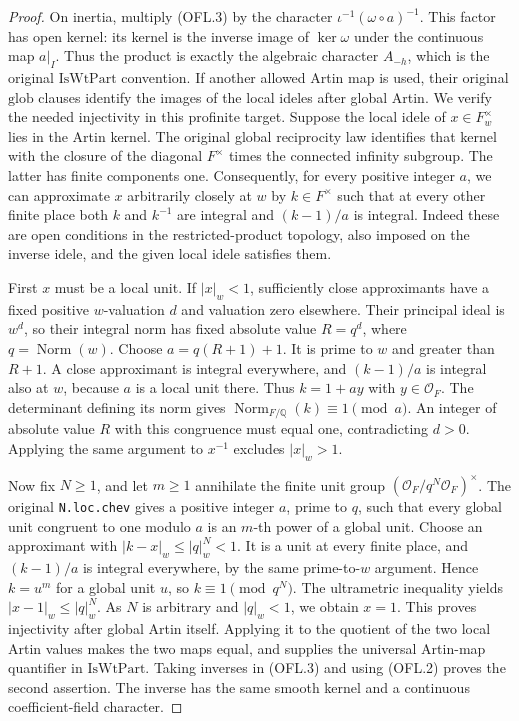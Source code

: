 \begin{proof}
On inertia, multiply (OFL.3) by the character
\(\iota^{-1}(\omega\circ a)^{-1}\).  This factor has open
kernel: its kernel is the inverse image of \(\ker\omega\)
under the continuous map \(a|_I\).  Thus the product is exactly
the algebraic character \(A_{-h}\), which is the original
\(\mathrm{IsWtPart}\) convention.  If another allowed Artin map
is used, their original \(\mathrm{glob}\) clauses identify the
images of the local ideles after global Artin.  We verify the
needed injectivity in this profinite target.  Suppose the local
idele of \(x\in F_w^\times\) lies in the Artin kernel.  The
original global reciprocity law identifies that kernel with the
closure of the diagonal \(F^\times\) times the connected
infinity subgroup.  The latter has finite components one.
Consequently, for every positive integer \(a\), we can approximate
\(x\) arbitrarily closely at \(w\) by \(k\in F^\times\)
such that at every other finite place both \(k\) and \(k^{-1}\)
are integral and \((k-1)/a\) is integral.  Indeed these are open
conditions in the restricted-product topology, also imposed on
the inverse idele, and the given local idele satisfies them.

First \(x\) must be a local unit.  If \(|x|_w<1\), sufficiently
close approximants have a fixed positive \(w\)-valuation \(d\)
and valuation zero elsewhere.  Their principal ideal is
\(w^d\), so their integral norm has fixed absolute value
\(R=q^d\), where \(q=\operatorname{Norm}(w)\).
Choose \(a=q(R+1)+1\).  It is prime to \(w\) and greater
than \(R+1\).  A close approximant is integral everywhere,
and \((k-1)/a\) is integral also at \(w\), because \(a\)
is a local unit there.  Thus \(k=1+ay\) with \(y\in\mathcal O_F\).
The determinant defining its norm gives
\(\operatorname{Norm}_{F/\mathbb Q}(k)\equiv1\pmod a\).
An integer of absolute value \(R\) with this congruence must
equal one, contradicting \(d>0\).  Applying the same argument
to \(x^{-1}\) excludes \(|x|_w>1\).

Now fix \(N\ge1\), and let \(m\ge1\) annihilate the finite
unit group \((\mathcal O_F/q^N\mathcal O_F)^\times\).
The original \texttt{N.loc.chev} gives a positive integer
\(a\), prime to \(q\), such that every global unit congruent
to one modulo \(a\) is an \(m\)-th power of a global unit.
Choose an approximant with
\(|k-x|_w\le |q|_w^N<1\).  It is a unit at every finite
place, and \((k-1)/a\) is integral everywhere, by the same
prime-to-\(w\) argument.  Hence \(k=u^m\) for a global unit
\(u\), so \(k\equiv1\pmod{q^N}\).  The ultrametric
inequality yields \(|x-1|_w\le |q|_w^N\).
As \(N\) is arbitrary and \(|q|_w<1\), we obtain \(x=1\).
This proves injectivity after global Artin itself.  Applying it
to the quotient of the two local Artin values makes the two maps
equal, and supplies the universal Artin-map quantifier in
\(\mathrm{IsWtPart}\).  Taking inverses in (OFL.3)
and using (OFL.2) proves the second assertion.  The inverse has the
same smooth kernel and a continuous coefficient-field character.
\end{proof}

